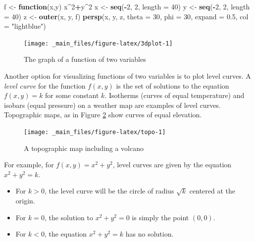 \documentclass[
]{book}
\newenvironment{Shaded}{\begin{snugshade}}{\end{snugshade}}
\newcommand{\AttributeTok}[1]{\textcolor[rgb]{0.13,0.29,0.53}{#1}}
\newcommand{\ControlFlowTok}[1]{\textcolor[rgb]{0.13,0.29,0.53}{\textbf{#1}}}
\newcommand{\DecValTok}[1]{\textcolor[rgb]{0.00,0.00,0.81}{#1}}
\newcommand{\FloatTok}[1]{\textcolor[rgb]{0.00,0.00,0.81}{#1}}
\newcommand{\FunctionTok}[1]{\textcolor[rgb]{0.13,0.29,0.53}{\textbf{#1}}}
\newcommand{\NormalTok}[1]{#1}
\newcommand{\OtherTok}[1]{\textcolor[rgb]{0.56,0.35,0.01}{#1}}
\newcommand{\SpecialCharTok}[1]{\textcolor[rgb]{0.81,0.36,0.00}{\textbf{#1}}}
\newcommand{\StringTok}[1]{\textcolor[rgb]{0.31,0.60,0.02}{#1}}
\theoremstyle{definition}
\theoremstyle{definition}
\theoremstyle{definition}
\theoremstyle{definition}
\theoremstyle{remark}
\begin{document}
\begin{Shaded}
\begin{Highlighting}[]
\NormalTok{f }\OtherTok{\textless{}{-}} \ControlFlowTok{function}\NormalTok{(x,y) x}\SpecialCharTok{\^{}}\DecValTok{2}\SpecialCharTok{+}\NormalTok{y}\SpecialCharTok{\^{}}\DecValTok{2}
\NormalTok{x }\OtherTok{\textless{}{-}} \FunctionTok{seq}\NormalTok{(}\SpecialCharTok{{-}}\DecValTok{2}\NormalTok{, }\DecValTok{2}\NormalTok{, }\AttributeTok{length =} \DecValTok{40}\NormalTok{)}
\NormalTok{y }\OtherTok{\textless{}{-}} \FunctionTok{seq}\NormalTok{(}\SpecialCharTok{{-}}\DecValTok{2}\NormalTok{, }\DecValTok{2}\NormalTok{, }\AttributeTok{length =} \DecValTok{40}\NormalTok{)}
\NormalTok{z }\OtherTok{\textless{}{-}} \FunctionTok{outer}\NormalTok{(x, y, f)}
\FunctionTok{persp}\NormalTok{(x, y, z, }\AttributeTok{theta =} \DecValTok{30}\NormalTok{, }\AttributeTok{phi =} \DecValTok{30}\NormalTok{,  }
      \AttributeTok{expand =} \FloatTok{0.5}\NormalTok{, }\AttributeTok{col =} \StringTok{"lightblue"}\NormalTok{)}
\end{Highlighting}
\end{Shaded}

\begin{figure}

{\centering \texttt{[image: \_main\_files/figure-latex/3dplot-1]} 

}

\caption{The graph of a function of two variables}\label{fig:3dplot}
\end{figure}

Another option for visualizing functions of two variables is to plot level curves. A \emph{level curve} for the function \(f(x,y)\) is the set of solutions to the equation
\(f(x,y)=k\) for some constant \(k\). Isotherms (curves of equal temperature) and isobars (equal pressure) on a weather map are examples of level curves. Topographic maps, as in Figure \ref{fig:topo} show curves of equal elevation.

\begin{figure}

{\centering \texttt{[image: \_main\_files/figure-latex/topo-1]} 

}

\caption{A topographic map including a volcano}\label{fig:topo}
\end{figure}

For example, for \(f(x,y)=x^2+y^2\), level curves are given by the equation \(x^2+y^2=k.\)

\begin{itemize}
\item
  For \(k>0\), the level curve will be the circle of radius \(\sqrt{k}\) centered at the origin.
\item
  For \(k=0\), the solution to \(x^2+y^2=0\) is simply the point \((0,0)\).
\item
  For \(k<0\), the equation \(x^2+y^2=k\) has no solution.
\end{itemize}
\end{document}
